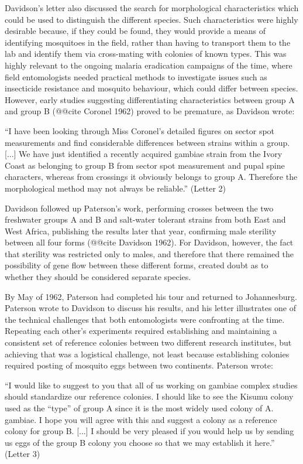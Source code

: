 \documentclass[a4paper,11pt,abstracton,hidelinks]{scrartcl}
\begin{document}
Davidson's letter also discussed the search for morphological characteristics which could be used to distinguish the different species.
%
Such characteristics were highly desirable because, if they could be found, they would provide a means of identifying mosquitoes in the field, rather than having to transport them to the lab and identify them via cross-mating with colonies of known types.
%
This was highly relevant to the ongoing malaria eradication campaigns of the time, where field entomologists needed practical methods to investigate issues such as insecticide resistance and mosquito behaviour, which could differ between species.
%
However, early studies suggesting differentiating characteristics between group A and group B (@@cite Coronel 1962) proved to be premature, as Davidson wrote:
\begin{displayquote}
``I have been looking through Miss Coronel's detailed figures on sector spot measurements and find considerable differences between strains within a group.
%
[...] We have just identified a recently acquired gambiae strain from the Ivory Coast as belonging to group B from sector spot measurement and pupal spine characters, whereas from crossings it obviously belongs to group A.
%
Therefore the morphological method may not always be reliable.'' (Letter 2)
\end{displayquote}


Davidson followed up Paterson's work, performing crosses between the two freshwater groups A and B and salt-water tolerant strains from both East and West Africa, publishing the results later that year, confirming male sterility between all four forms (@@cite Davidson 1962).
%
For Davidson, however, the fact that sterility was restricted only to males, and therefore that there remained the possibility of gene flow between these different forms, created doubt as to whether they should be considered separate species.


By May of 1962, Paterson had completed his tour and returned to Johannesburg.
%
Paterson wrote to Davidson to discuss his results, and his letter illustrates one of the technical challenges that both entomologists were confronting at the time.
%
Repeating each other's experiments required establishing and maintaining a consistent set of reference colonies between two different research institutes, but achieving that was a logistical challenge, not least because establishing colonies required posting of mosquito eggs between two continents.
%
Paterson wrote:
\begin{displayquote}
``I would like to suggest to you that all of us working on gambiae complex studies should standardize our reference colonies.
%
I should like to see the Kisumu colony used as the ``type'' of group A since it is the most widely used colony of A. gambiae.
%
I hope you will agree with this and suggest a colony as a reference colony for group B. 
%
[...] I should be very pleased if you would help us by sending us eggs of the group B colony you choose so that we may establish it here.'' (Letter 3)
\end{displayquote}
\end{document}
